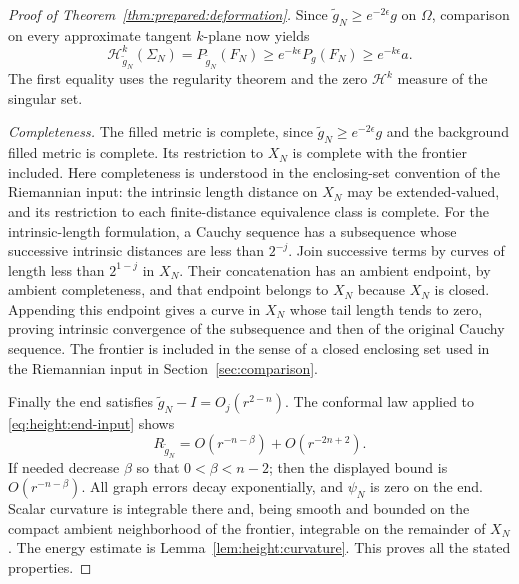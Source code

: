 \begin{proof}[Proof of Theorem~\ref{thm:prepared:deformation}]
Since $\widetilde g_N\ge e^{-2\epsilon}g$ on $\Omega$, comparison
on every approximate tangent $k$-plane now yields
\begin{equation}\label{eq:height:original-area}
 \mathcal H^k_{\widetilde g_N}(\Sigma_N)
 =P_{\widetilde g_N}(F_N)
 \ge e^{-k\epsilon}P_g(F_N)\ge e^{-k\epsilon}a.
\end{equation}
The first equality uses the regularity theorem and the zero
$\mathcal H^k$ measure of the singular set.

\medskip\noindent\emph{Completeness.} The filled metric is complete, since
$\widetilde g_N\ge e^{-2\epsilon}g$ and the background filled metric
is complete.  Its restriction to $X_N$ is complete with the frontier
included.  Here completeness is understood in the enclosing-set
convention of the Riemannian input: the intrinsic length distance on
$X_N$ may be extended-valued, and its restriction to each finite-distance
equivalence class is complete.  For the intrinsic-length formulation, a Cauchy sequence
has a subsequence whose successive intrinsic distances are less than
$2^{-j}$.  Join successive terms by curves of length less than
$2^{1-j}$ in $X_N$.  Their concatenation has an ambient endpoint,
by ambient completeness, and that endpoint belongs to $X_N$ because
$X_N$ is closed.  Appending this endpoint gives a curve in $X_N$
whose tail length tends to zero, proving intrinsic convergence of the
subsequence and then of the original Cauchy sequence.  The frontier
is included in the sense of a closed enclosing set used in
the Riemannian input in Section~\ref{sec:comparison}.

Finally the end satisfies $\widetilde g_N-I=O_j(r^{2-n})$.
The conformal law applied to \eqref{eq:height:end-input}
shows
\[
 R_{\widetilde g_N}=O(r^{-n-\beta})+O(r^{-2n+2}).
\]
If needed decrease $\beta$ so that $0<\beta<n-2$; then the displayed
bound is $O(r^{-n-\beta})$.  All graph errors decay exponentially,
and $\psi_N$ is zero on the end.  Scalar curvature is integrable there
and, being smooth and bounded on the compact ambient neighborhood of
the frontier, integrable on the remainder of $X_N$.
The energy estimate is Lemma~\ref{lem:height:curvature}.  This proves
all the stated properties.
\end{proof}

